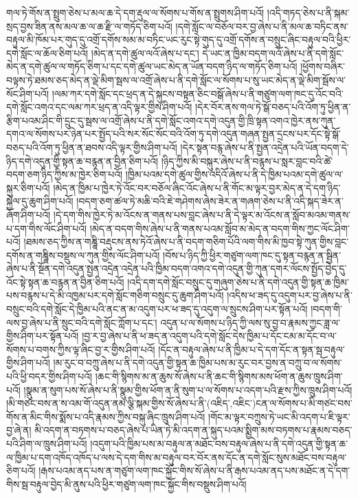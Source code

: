 གལ་ཏེ་གོས་ན་སྤྲུག་ཅེས་པ་མལ་ཆ་དེ་དག་རྡུལ་ལ་སོགས་པ་གོས་ན་སྤྲུགས་ཤིག་པའོ། །འདི་གཏད་ཅེས་པ་ནི་སྐམ་སྲད་བྱས་ཟིན་ནས་མལ་ཆ་ལ་ཆ་རྫི་ལ་གཏོད་ཅིག་པའོ། །དགེ་སློང་ལ་བཅོལ་བར་བྱ་ཞེས་པ་ནི་མལ་ཆ་བཏིང་ནས་བརྟུལ་མི་ཁོམ་པར་གུད་དུ་འགྲོ་དགོས་སམ་མ་བཏིང་ཡང་རུང་སྟེ་གུད་དུ་འགྲོ་དགོས་ན་བསྲུང་ཞིང་བརྟུལ་བའི་ཕྱིར་དགེ་སློང་ལ་ཆོལ་ཅིག་པའོ། །མེད་ན་དགེ་ཚུལ་ལའོ་ཞེས་པ་དང་། དེ་ཡང་ན་ཁྱིམ་བདག་ལའོ་ཞེས་པ་ནི་དགེ་སློང་མེད་ན་དགེ་ཚུལ་ལ་གཏོད་ཅིག་པ་དང་དགེ་ཚུལ་ཡང་མེད་ན་ཡོན་བདག་ཉིད་ལ་གཏོད་ཅིག་པའོ། །ཕྱོགས་བཞིར་བལྟས་ཏེ་ཐམས་ཅད་མེད་ན་ལྡེ་མིག་སྦས་ལ་འགྲོ་ཞེས་པ་ནི་དགེ་སློང་ལ་སོགས་པ་སུ་ཡང་མེད་ན་ལྡེ་མིག་སྦོས་ལ་སོང་ཤིག་པའོ། །ལམ་ཀར་དགེ་སློང་དང་ཕྲད་ན་དེ་སྐུངས་བསྟན་ཅིང་བསྒོ་ཞེས་པ་ནི་གཙུག་ལག་ཁང་དུ་འོང་བའི་དགེ་སློང་འགའ་དང་ལམ་ཀར་ཕྲད་ན་འདི་ལྟར་གྱིས་ཤིག་པའོ། །དེར་བོར་ནས་གལ་ཏེ་སྒོ་བཅད་པའི་འོག་ཏུ་ཕྱིན་ན་རྩིག་པའམ་ཤིང་གི་དྲུང་དུ་སྦས་ལ་འགྲོ་ཞེས་པ་ནི་དགེ་སློང་འགའ་དགེ་འདུན་གྱི་ཁྲི་སྟན་འགའ་ཁྱེར་ནས་ཀུན་དགའ་ལ་སོགས་པར་ཉེན་པར་སྤྱོད་པའི་སར་སོང་སོང་བའི་འོག་ཏུ་དགེ་འདུན་གཞན་སྤྱན་དྲངས་པར་དོང་སྟེ་སྒོ་བཅད་པའི་འོག་ཏུ་ཕྱིན་ན་ཐབས་འདི་ལྟར་གྱིས་ཤིག་པའོ། །དེར་སྟན་བརྙ་ཞེས་པ་ནི་སྤྱན་འདྲེན་པའི་ཡོན་བདག་དེ་ཉིད་དགེ་འདུན་གྱི་སྟན་ཆ་བརྙན་ན་བྱིན་ཅིག་པའོ། །ཉིད་ཀྱིས་མི་བསྐུར་ཞེས་པ་ནི་བརྙས་པ་སླར་བླང་བའི་ཚེ་བདག་ཅག་ཉིད་ཀྱིས་མ་ཁྱེར་ཅིག་པའོ། །ཁྱིམ་པའམ་དགེ་ཚུལ་གྱིས་འདིའོ་ཞེས་པ་ནི་དེ་ཁྱིམ་པའམ་དགེ་ཚུལ་ལ་སྐུར་ཅིག་པའོ། །མེད་ན་ཁྱིམ་པ་ཁྱེར་ཏེ་འོང་བར་བཅོལ་ཞིང་འོང་ཞེས་པ་ནི་གོང་མ་ལྟར་བྱར་མེད་ན་དེ་དག་ཉིད་སྐྱེལ་དུ་ཆུག་ཤིག་པའོ། །བདག་ཅག་ཚལ་ཏེ་མཆི་བའི་ཇེ་གཤེགས་ཞེས་ཟེར་ན་གཞག་ཅེས་པ་ནི་འདི་སྐད་ཟེར་ན་ཞོག་ཤིག་པའོ། །དེ་དག་གིས་ཁྱེར་ཏེ་མ་འོངས་ན་གནས་པས་བླང་ཞེས་པ་ནི་དེ་ལྟར་མ་འོངས་ན་སློབ་མའམ་གནས་པ་དག་གིས་ལོང་ཤིག་པའོ། །མེད་ན་བདག་གིས་ཞེས་པ་ནི་གནས་པའམ་སློབ་མ་མེད་ན་བདག་གིས་ཀྱང་ལོང་ཤིག་པའོ། །ཐམས་ཅད་ཀྱིས་ན་གཎྜཱི་བརྡུངས་ནས་ཏེའོ་ཞེས་པ་ནི་བདག་གཅིག་པོའི་ལག་གིས་མི་ཁྱབ་སྟེ་ཀུན་གྱིས་བླང་དགོས་ན་གཎྜཱིས་བསྡུས་ལ་ཀུན་གྱིས་ལོང་ཤིག་པའོ། །བོས་པ་ཉིད་ཀྱི་ཕྱིར་གཙུག་ལག་ཁང་དུ་སྟན་བརྙན་ན་སྦྱིན་ཞེས་པ་ནི་སྔོན་དགེ་འདུན་སྤྱན་འདྲེན་འདྲེན་པའི་ཁྱིམ་བདག་འགའ་དགེ་འདུན་གྱི་ཀུན་དགར་ལོངས་སྤྱོད་བྱེད་དུ་འོང་སྟེ་སྟན་ཆ་བརྙན་ན་བྱིན་ཅིག་པའོ། །འདི་དག་དགེ་སློང་བསྲུང་དུ་གཞུག་ཅེས་པ་ནི་དགེ་འདུན་གྱི་སྟན་ཆ་ཁྱིམ་པས་བརྙས་པ་དེ་མི་འཁྱམ་པར་དགེ་སློང་གཅིག་བསྲུང་དུ་ཆུག་ཤིག་པའོ། །འདིས་ཕ་ཟད་དུ་འདུག་པར་བྱ་ཞེས་པ་ནི་བསྲུང་བའི་དགེ་སློང་དེ་ཁྱིམ་པའི་ནང་ན་མ་འདུག་པར་ཕ་ཟད་དུ་འདུག་ལ་སྲུངས་ཤིག་པར་སྟོན་པའོ། །བདག་གི་ལས་བྱ་ཞེས་པ་ནི་སྲུང་བའི་དགེ་སློང་ཀློག་པ་དང་། འདུན་པ་ལ་སོགས་པ་ཉིད་ཀྱི་ལས་སུ་བྱ་བ་རྣམས་ཀྱང་ཟླ་ལ་གྱིས་ཤིག་པར་སྟོན་པའོ། །བྱ་ར་བྱ་ཞེས་པ་ནི་ཕ་ཟད་ན་འདུག་པའི་དགེ་སློང་དེས་ཁྱིམ་པ་དོང་ངམ་མ་དོང་བ་ལ་སོགས་པ་བགས་ཀྱིས་ལྟ་ཞིང་བྱ་ར་གྱིས་ཤིག་པའོ། །དོང་ན་བརྟུལ་ཞེས་པ་ནི་ཁྱིམ་པ་དེ་དག་དོང་ན་སྟན་སྦ་བརྟུལ་གྱིས་ཤིག་པའོ། །མ་རུང་བ་བཀྲུ་ཞེས་པ་ནི་དགེ་འདུན་གྱི་སྟན་ཆ་ཁྱིམ་པས་མ་རུང་བར་བྱས་ན་བཀྲུ་བ་ལ་སོགས་པའི་ཕྱི་བདར་གྱིས་ཤིག་པའོ། །ཆང་གི་སྙིགས་མ་ན་ཆུས་སོ་ཞེས་པ་ནི་ཆང་གི་སྙིགས་མས་ཕོག་ན་ཆུས་ཁྲུས་ཤིག་པའོ། །སྣུམ་ན་སུག་པས་སོ་ཞེས་པ་ནི་སྣུམ་གྱིས་ཕོག་ན་ནི་སུག་པ་ལ་སོགས་པ་འདག་པའི་རྫས་ཀྱིས་ཁྲུས་ཤིག་པའོ། །མི་གཙང་བས་ན་ས་འམ་གོ་འདུན་ནམ་ལྕི་སྐམ་གྱིས་སོ་ཞེས་པ་ནི་(འཇིད་‚འཇིང་)ངན་ལ་སོགས་པ་མི་གཙང་བས་གོས་ན་མིང་གིས་སྨོས་པ་འདི་རྣམས་ཀྱིས་བསྐུ་ཞིང་ཁྲུས་ཤིག་པའོ། །གོང་མ་ལྟར་བཀྲུས་ཏེ་ཡང་མི་འདག་པ་ཇི་ལྟར་བྱ་ཞེ་ན། མི་འདག་ན་བཏགས་པ་བཅད་ཞེས་པ་ཡིན་ཏེ་མི་འདག་ན་སྐུད་པའམ་སྨྱིག་མས་བཏགས་པ་རྣམས་བཅད་པའི་ཤིག་ལ་ཁྲུས་ཤིག་པའོ། །འདུག་པའི་ཁྱིམ་པས་མ་བརྟུལ་ན་མཐོང་བས་བརྟུལ་ཞེས་པ་ནི་དགེ་འདུན་གྱི་སྟན་ཆ་ལ་ཁྱིམ་པ་དག་འཁོད་འཁོད་པ་ལས་དེ་དག་གིས་མ་བརྟུལ་བར་བོར་ནས་དོང་ན་དགེ་སློང་སུས་མཐོང་བས་བརྟུལ་ཅིག་པའོ། །རྒས་པའམ་ནད་པས་ན་གཙུག་ལག་ཁང་སྐྱོང་གིས་སོ་ཞེས་པ་ནི་རྒས་པའམ་ནད་པས་མཐོང་ན་དེ་དག་གིས་སྦ་བརྟུལ་བྱེད་མི་ནུས་པའི་ཕྱིར་གཙུག་ལག་ཁང་སྐྱོང་གིས་བསྡུས་ཤིག་པའོ། 